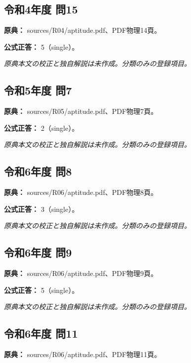 \subsection{令和4年度 問15}
\label{q:r04-reg-apt-15}

\noindent\textbf{原典：} sources/R04/aptitude.pdf、PDF物理14頁。

\textbf{公式正答：} 5（single）。

\par\textit{原典本文の校正と独自解説は未作成。分類のみの登録項目。}

\subsection{令和5年度 問7}
\label{q:r05-reg-apt-07}

\noindent\textbf{原典：} sources/R05/aptitude.pdf、PDF物理7頁。

\textbf{公式正答：} 2（single）。

\par\textit{原典本文の校正と独自解説は未作成。分類のみの登録項目。}

\subsection{令和6年度 問8}
\label{q:r06-reg-apt-08}

\noindent\textbf{原典：} sources/R06/aptitude.pdf、PDF物理8頁。

\textbf{公式正答：} 3（single）。

\par\textit{原典本文の校正と独自解説は未作成。分類のみの登録項目。}

\subsection{令和6年度 問9}
\label{q:r06-reg-apt-09}

\noindent\textbf{原典：} sources/R06/aptitude.pdf、PDF物理9頁。

\textbf{公式正答：} 5（single）。

\par\textit{原典本文の校正と独自解説は未作成。分類のみの登録項目。}

\subsection{令和6年度 問11}
\label{q:r06-reg-apt-11}

\noindent\textbf{原典：} sources/R06/aptitude.pdf、PDF物理11頁。


